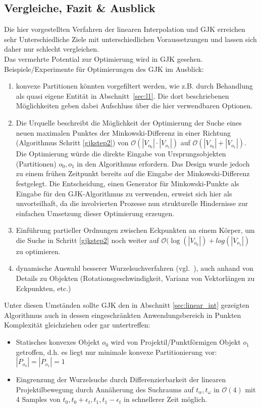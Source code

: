 \subsection{Vergleiche, Fazit \& Ausblick}
\label{sec:ausblick}
Die hier vorgestellten Verfahren der linearen Interpolation und GJK erreichen sehr Unterschiedliche Ziele mit unterschiedlichen Voraussetzungen und lassen sich daher nur schlecht vergleichen.\\
Das vermehrte Potential zur Optimierung wird in GJK gesehen.
Beispiele/Experimente für Optimierungen des GJK im Ausblick:
\begin{enumerate}
\item konvexe Partitionen könnten vorgefiltert werden, wie z.B. durch Behandlung als quasi eigene Entität in Abschnitt~\ref{sec:l1}. Die dort beschriebenen Möglichkeiten geben dabei Aufschluss über die hier verwendbaren Optionen.
\item Die Urquelle \cite[p.196, math. Indices (16), (17), (21)]{gjk} beschreibt die Möglichkeit der Optimierung der Suche eines neuen maximalen Punktes der Minkowski-Differenz in einer Richtung (Algorithmus Schritt \ref{gjkstep2}) von $\mathcal{O}(|V_{o_0}|\cdot |V_{o_1}|)$ auf $\mathcal{O}(|V_{o_0}|+|V_{o_1}|)$. Die Optimierung würde die direkte Eingabe von Ursprungsobjekten (Partitionen) $o_0, o_1$ in den Algorithmus erfordern. Das Design wurde jedoch zu einem frühen Zeitpunkt bereits auf die Eingabe der Minkowski-Differenz festgelegt. Die Entscheidung, einen Generator für Minkowski-Punkte als Eingabe für den GJK-Algorithmus zu verwenden, erweist sich hier als unvorteilhaft, da die involvierten Prozesse nun strukturelle Hindernisse zur einfachen Umsetzung dieser Optimierung erzeugen.
\item Einführung partieller Ordnungen zwischen Eckpunkten an einem Körper, um die Suche in Schritt \ref{gjkstep2} noch weiter auf $\mathcal{O}(\log(|V_{o_0}|)+log(|V_{o_1}|)$ zu optimieren.
\item dynamische Auswahl besserer Wurzelsuchverfahren (vgl.~\cite{gdc-physics}), auch anhand von Details zu Objekten (Rotationsgeschwindigkeit, Varianz von Vektorlängen zu Eckpunkten, etc.)
\end{enumerate}
Unter diesen Umständen sollte GJK den in Abschnitt \ref{sec:linear_int} gezeigten Algorithmus auch in dessen eingeschränkten Anwendungsbereich in Punkten Komplexität gleichziehen oder gar untertreffen:
\begin{itemize}
\item Statisches konvexes Objekt $o_0$ wird von Projektil/Punktförmigen Objekt $o_1$ getroffen, d.h. es liegt nur minimale konvexe Partitionierung vor: $|P_{o_o}| = |P_{o_1}| = 1$
\item Eingrenzung der Wurzelsuche durch Differenzierbarkeit der linearen Projektilbewegung durch Annäherung des Suchraums auf $t_{\alpha}, t_{\omega}$ in $\mathcal{O}(4)$ mit 4 Samples von $t_0, t_0+\epsilon_{t}, t_1, t_1 - \epsilon_{t}$ in schnellerer Zeit  möglich.
\end{itemize}
